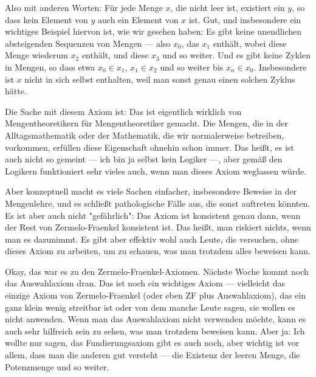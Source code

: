 \begin{spoken-clean}[00:05:48 - 00:08:20]
Also mit anderen Worten: Für jede Menge $x$, die nicht leer ist, existiert ein $y$, so dass kein Element von $y$ auch ein Element von $x$ ist. Gut, und insbesondere ein wichtiges Beispiel hiervon ist, wie wir gesehen haben: Es gibt keine unendlichen absteigenden Sequenzen von Mengen --- also $x_0$, das $x_1$ enthält, wobei diese Menge wiederum $x_2$ enthält, und diese $x_3$ und so weiter. Und es gibt keine Zyklen in Mengen, so dass etwa $x_0 \in x_1$, $x_1 \in x_2$ und so weiter bis $x_n \in x_0$. Insbesondere ist $x$ nicht in sich selbst enthalten, weil man sonst genau einen solchen Zyklus hätte.

Die Sache mit diesem Axiom ist: Das ist eigentlich wirklich von Mengentheoretikern für Mengentheoretiker gemacht. Die Mengen, die in der Alltagsmathematik oder der Mathematik, die wir normalerweise betreiben, vorkommen, erfüllen diese Eigenschaft ohnehin schon immer. Das heißt, es ist auch nicht so gemeint --- ich bin ja selbst kein Logiker ---, aber gemäß den Logikern funktioniert sehr vieles auch, wenn man dieses Axiom weglassen würde.

Aber konzeptuell macht es viele Sachen einfacher, insbesondere Beweise in der Mengenlehre, und es schließt pathologische Fälle aus, die sonst auftreten könnten. Es ist aber auch nicht "gefährlich": Das Axiom ist konsistent genau dann, wenn der Rest von Zermelo-Fraenkel konsistent ist. Das heißt, man riskiert nichts, wenn man es dazunimmt. Es gibt aber effektiv wohl auch Leute, die versuchen, ohne dieses Axiom zu arbeiten, um zu schauen, was man trotzdem alles beweisen kann.

Okay, das war es zu den Zermelo-Fraenkel-Axiomen. Nächste Woche kommt noch das Auswahlaxiom dran. Das ist noch ein wichtiges Axiom --- vielleicht das einzige Axiom von Zermelo-Fraenkel (oder eben ZF plus Auswahlaxiom), das ein ganz klein wenig streitbar ist oder von dem manche Leute sagen, sie wollen es nicht anwenden. Wenn man das Auswahlaxiom nicht verwenden möchte, kann es auch sehr hilfreich sein zu sehen, was man trotzdem beweisen kann. Aber ja: Ich wollte nur sagen, das Fundierungsaxiom gibt es auch noch, aber wichtig ist vor allem, dass man die anderen gut versteht --- die Existenz der leeren Menge, die Potenzmenge und so weiter.
\end{spoken-clean}

\begin{ai-global-state-checkpoint-invisible-content}
\end{ai-global-state-checkpoint-invisible-content}


